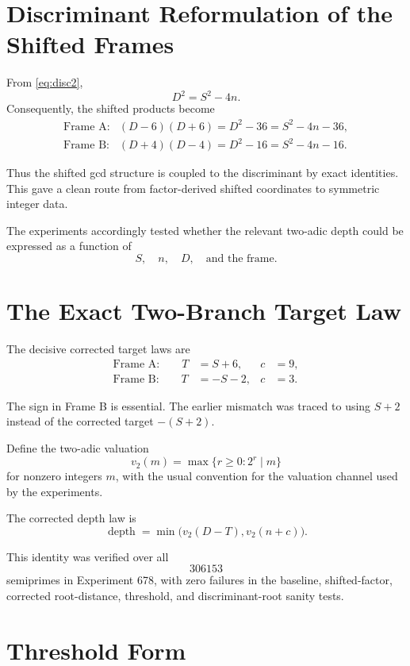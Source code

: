 \documentclass[11pt,a4paper]{article}
\begin{document}
\section{Discriminant Reformulation of the Shifted Frames}

From \eqref{eq:disc2},
\[
 D^2=S^2-4n.
\]
Consequently, the shifted products become
\begin{align}
 \text{Frame A:}
 &(D-6)(D+6)=D^2-36
 =S^2-4n-36,
 \\
 \text{Frame B:}
 &(D+4)(D-4)=D^2-16
 =S^2-4n-16.
\end{align}

Thus the shifted gcd structure is coupled to the discriminant by exact identities.  This gave a clean route from factor-derived shifted coordinates to symmetric integer data.

The experiments accordingly tested whether the relevant two-adic depth could be expressed as a function of
\[
 S,
 \quad n,
 \quad D,
 \quad\text{and the frame.}
\]

\section{The Exact Two-Branch Target Law}

The decisive corrected target laws are
\begin{align}
 \text{Frame A:}\qquad T&=S+6, & c&=9,
 \label{eq:A-target}\\
 \text{Frame B:}\qquad T&=-S-2, & c&=3.
 \label{eq:B-target}
\end{align}

The sign in Frame B is essential.  The earlier mismatch was traced to using $S+2$ instead of the corrected target $-(S+2)$.

Define the two-adic valuation
\[
 v_2(m)=\max\{r\ge 0:2^r\mid m\}
\]
for nonzero integers $m$, with the usual convention for the valuation channel used by the experiments.

The corrected depth law is
\begin{equation}
 \boxed{
 \operatorname{depth}
 =
 \min\!\bigl(v_2(D-T),v_2(n+c)\bigr).
 }
 \label{eq:depth}
\end{equation}

This identity was verified over all
\[
306153
\]
semiprimes in Experiment 678, with zero failures in the baseline, shifted-factor, corrected root-distance, threshold, and discriminant-root sanity tests.

\section{Threshold Form}
\end{document}
